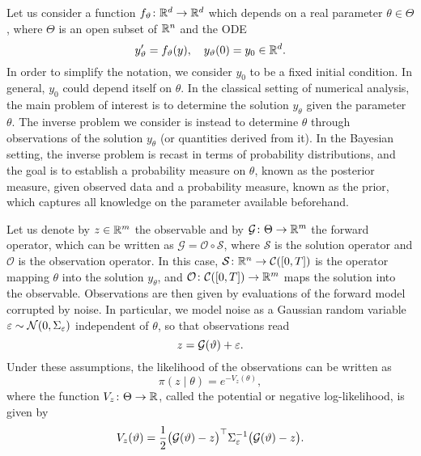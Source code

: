 \documentclass[10pt]{article}
\begin{document}
Let us consider a function $f_\vartheta \colon \mathbb{R}^d \to \mathbb{R}^d$ which depends on a real parameter $\theta \in \Theta$, where $\Theta$ is an open subset of $\mathbb{R}^n$ and the ODE
\begin{equation}\label{eq:ODEParam}
	y_\vartheta' = f_\vartheta(y), \quad y_\vartheta(0) = y_0 \in \mathbb{R}^d.
\end{equation}
In order to simplify the notation, we consider $y_0$ to be a fixed initial condition. In general, $y_0$ could depend itself on $\theta$. In the classical setting of numerical analysis, the main problem of interest is to determine the solution $y_\theta$ given the parameter $\theta$. The inverse problem we consider is instead to determine $\theta$ through observations of the solution $y_\theta$ (or quantities derived from it). In the Bayesian setting, the inverse problem is recast in terms of probability distributions, and the goal is to establish a probability measure on $\theta$, known as the posterior measure, given observed data and a probability measure, known as the prior, which captures all knowledge on the parameter available beforehand.

Let us denote by $z \in \mathbb{R}^m$ the observable and by $\mathcal G\colon \Theta \to \mathbb{R}^m$ the forward operator, which can be written as $\mathcal G = \mathcal O \circ \mathcal S$, where $\mathcal S$ is the solution operator and $\mathcal O$ is the observation operator. In this case, $\mathcal S \colon \mathbb{R}^n \to \mathcal C([0, T])$ is the operator mapping $\theta$ into the solution $y_\theta$, and $\mathcal O \colon \mathcal C([0, T]) \to \mathbb{R}^m$ maps the solution into the observable. Observations are then given by evaluations of the forward model corrupted by noise. In particular, we model noise as a Gaussian random variable $\varepsilon \sim \mathcal{N}(0, \Sigma_\varepsilon)$ independent of $\theta$, so that observations read
\begin{equation}
	z = \mathcal{G}(\vartheta) + \varepsilon.
\end{equation}
Under these assumptions, the likelihood of the observations can be written as
\begin{equation}\label{eq:Likelihood}
	\pi(z \mid \theta) = e^{-V_z(\theta)},
\end{equation}
where the function $V_z\colon\Theta \to \mathbb{R}$, called the potential or negative log-likelihood, is given by
\begin{equation}\label{eq:Potential}
	V_z(\vartheta) = \frac{1}{2}\big(\mathcal{G}(\vartheta) - z\big)^\top \Sigma_\varepsilon^{-1} \big(\mathcal{G}(\vartheta) - z\big).
\end{equation}
\end{document}
